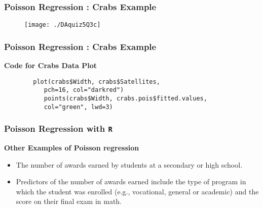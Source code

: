 \documentclass[MASTER.tex]{subfiles}
\begin{document}
\begin{frame}[fragile]
	\frametitle{Poisson Regression :  Crabs Example}
	\begin{figure}[h!]
		\centering
		\texttt{[image: ./DAquiz5Q3c]}
	\end{figure}
\end{frame}
\begin{frame}[fragile]
	\frametitle{Poisson Regression :  Crabs Example}
	\large
	\textbf{Code for Crabs Data Plot}
	\begin{framed}
		\begin{verbatim}
		plot(crabs$Width, crabs$Satellites,
		   pch=16, col="darkred")
		   points(crabs$Width, crabs.pois$fitted.values, 
		   col="green", lwd=3)
		\end{verbatim}
	\end{framed}
\end{frame}

%

\begin{frame}[fragile]

\frametitle{Poisson Regression with \texttt{R} } 
 
 \Large	
 
 \textbf{Other Examples of Poisson regression} \\
 	
 \begin{itemize}	
 \item The number of awards earned by students at a secondary or high school. 
 \item Predictors of the number of awards earned include the type of program in which the student was enrolled (e.g., vocational, general or academic) and the score on their final exam in math.
 \end{itemize}
 
\end{frame}
\end{document}
